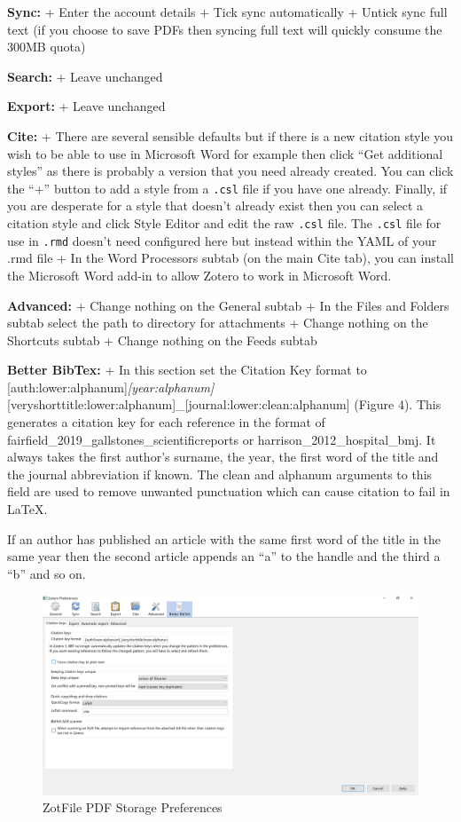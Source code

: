 \documentclass[]{book}
\begin{document}
\textbf{Sync:}
+ Enter the account details
+ Tick sync automatically
+ Untick sync full text (if you choose to save PDFs then syncing full text will quickly consume the 300MB quota)

\textbf{Search:}
+ Leave unchanged

\textbf{Export:}
+ Leave unchanged

\textbf{Cite:}
+ There are several sensible defaults but if there is a new citation style you wish to be able to use in Microsoft Word for example then click ``Get additional styles'' as there is probably a version that you need already created. You can click the ``+'' button to add a style from a \texttt{.csl} file if you have one already. Finally, if you are desperate for a style that doesn't already exist then you can select a citation style and click Style Editor and edit the raw \texttt{.csl} file. The \texttt{.csl} file for use in \texttt{.rmd} doesn't need configured here but instead within the YAML of your .rmd file
+ In the Word Processors subtab (on the main Cite tab), you can install the Microsoft Word add-in to allow Zotero to work in Microsoft Word.

\textbf{Advanced:}
+ Change nothing on the General subtab
+ In the Files and Folders subtab select the path to directory for attachments
+ Change nothing on the Shortcuts subtab
+ Change nothing on the Feeds subtab

\textbf{Better BibTex:}
+ In this section set the Citation Key format to {[}auth:lower:alphanum{]}\emph{{[}year:alphanum{]}}{[}veryshorttitle:lower:alphanum{]}\_{[}journal:lower:clean:alphanum{]} (Figure 4). This generates a citation key for each reference in the format of fairfield\_2019\_gallstones\_scientificreports or harrison\_2012\_hospital\_bmj. It always takes the first author's surname, the year, the first word of the title and the journal abbreviation if known. The clean and alphanum arguments to this field are used to remove unwanted punctuation which can cause citation to fail in LaTeX.

If an author has published an article with the same first word of the title in the same year then the second article appends an ``a'' to the handle and the third a ``b'' and so on.

\begin{figure}
\includegraphics[width=44.42in]{img/zotero_citation_key} \caption{ZotFile PDF Storage Preferences}\label{fig:zotfile-citation-key}
\end{figure}
\end{document}
